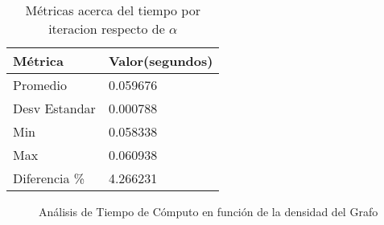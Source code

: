 \begin{table}[H]
    \centering
    \caption{Métricas acerca del tiempo por iteracion respecto de $\alpha$}    
        \label{tbl:exp4_data_notredame} 
    \setlength{\tabcolsep}{3pt}
    \begin{tabular}{|l|l|}
        \hline\hline
        Métrica & Valor(segundos)\\
        \hline
        Promedio & 0.059676\\
        Desv Estandar & 0.000788\\
        Min & 0.058338\\
        Max & 0.060938\\
        Diferencia \% & 4.266231\\
        \hline\hline
    \end{tabular}
\end{table}

\begin{figure}[H]
    \centering
    \caption{An\'alisis de Tiempo de C\'omputo en funci\'on de la densidad del Grafo}
\end{figure}

    

